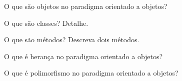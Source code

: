 \begin{questions}

\question O que são objetos no paradigma orientado a objetos?
\begin{solutionbox}{3.2in} 		
	\end{solutionbox}
\question O que são classes? Detalhe.

	\begin{solutionbox}{3.2in}
		
	\end{solutionbox}
\question O que são métodos? Descreva dois métodos.


	\begin{solutionbox}{2.3in}
		
	\end{solutionbox}

\question O que é herança no paradigma orientado a objetos?

	\begin{solutionbox}{2.3in} 		
	\end{solutionbox}
\question O que é polimorfismo no paradigma orientado a objetos?
	\begin{solutionbox}{2.3in} 		
	\end{solutionbox}

\end{questions}